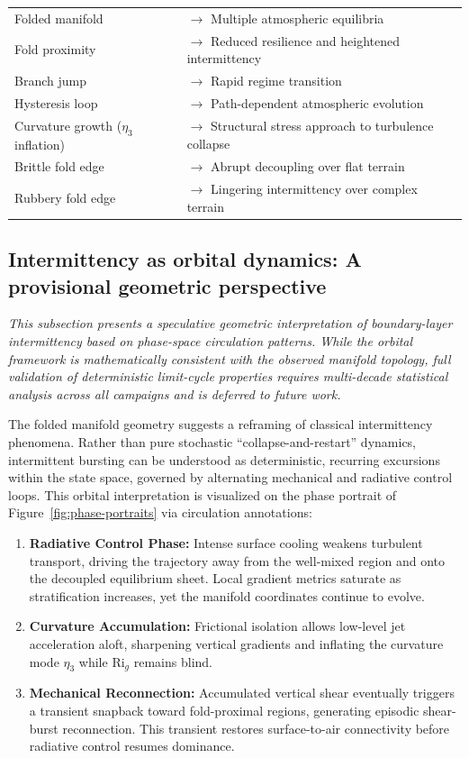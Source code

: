 \documentclass[12pt,a4paper]{article}
\newcommand{\Rig}{\mathrm{Ri}_g}
\begin{document}
\begin{tabular}{@{}ll@{}}
Folded manifold & $\to$ Multiple atmospheric equilibria \\
Fold proximity & $\to$ Reduced resilience and heightened intermittency \\
Branch jump & $\to$ Rapid regime transition \\
Hysteresis loop & $\to$ Path-dependent atmospheric evolution \\
Curvature growth ($\eta_3$ inflation) & $\to$ Structural stress approach to turbulence collapse \\
Brittle fold edge & $\to$ Abrupt decoupling over flat terrain \\
Rubbery fold edge & $\to$ Lingering intermittency over complex terrain \\
\end{tabular}

\subsection{Intermittency as orbital dynamics: A provisional geometric perspective}

\textit{This subsection presents a speculative geometric interpretation of boundary-layer intermittency based on phase-space circulation patterns. While the orbital framework is mathematically consistent with the observed manifold topology, full validation of deterministic limit-cycle properties requires multi-decade statistical analysis across all campaigns and is deferred to future work.}

The folded manifold geometry suggests a reframing of classical intermittency phenomena. Rather than pure stochastic ``collapse-and-restart'' dynamics, intermittent bursting can be understood as deterministic, recurring excursions within the state space, governed by alternating mechanical and radiative control loops. This orbital interpretation is visualized on the phase portrait of Figure~\ref{fig:phase-portraits} via circulation annotations:

\begin{enumerate}
  \item \textbf{Radiative Control Phase:} Intense surface cooling weakens turbulent transport, driving the trajectory away from the well-mixed region and onto the decoupled equilibrium sheet. Local gradient metrics saturate as stratification increases, yet the manifold coordinates continue to evolve.
  \item \textbf{Curvature Accumulation:} Frictional isolation allows low-level jet acceleration aloft, sharpening vertical gradients and inflating the curvature mode $\eta_3$ while $\Rig$ remains blind.
  \item \textbf{Mechanical Reconnection:} Accumulated vertical shear eventually triggers a transient snapback toward fold-proximal regions, generating episodic shear-burst reconnection. This transient restores surface-to-air connectivity before radiative control resumes dominance.
\end{enumerate}
\end{document}
